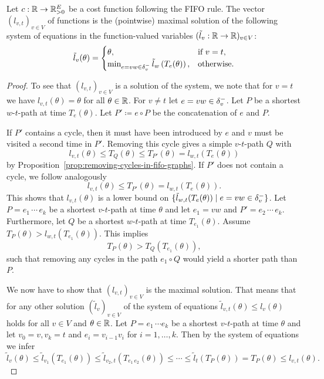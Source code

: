 \begin{proposition}\label{prop:characterization-arrival-functions}
    Let $c:\mathbb{R}\rightarrow\mathbb{R}_{>0}^E$ be a cost function following the FIFO rule.
    The vector $(l_{v,t})_{v\in V}$ of functions is the (pointwise) maximal solution of the following system of equations in the function-valued variables $(\tilde l_v: \mathbb{R} \rightarrow \mathbb{R})_{v\in V}$:
    \[
        \tilde l_v(\theta) = \begin{cases}
            \theta, &\text{if $v = t$}, \\
            \min_{\substack{
                e=vw\in\delta^-_{v}               
            }} \tilde{l}_w\left(
                T_e(\theta)
            \right), &\text{otherwise}.
        \end{cases}
    \]
\end{proposition}
\begin{proof}
    To see that $(l_{v,t})_{v\in V}$ is a solution of the system, we note that for $v = t$ we have $l_{v,t}(\theta) = \theta$ for all $\theta\in\mathbb{R}$.
    For $v\neq t$ let $e=vw\in\delta^-_{v}$.
    Let $P$ be a shortest $w$-$t$-path at time $T_{e}(\theta)$.
    Let $P'\coloneqq e\circ P$ be the concatenation of $e$ and $P$.

    If $P'$ contains a cycle, then it must have been introduced by $e$ and $v$ must be visited a second time in $P'$.
    Removing this cycle gives a simple $v$-$t$-path $Q$ with 
    \[
        l_{v,t}(\theta) \leq T_{Q}(\theta)\leq T_{P'}(\theta) = l_{w,t}(T_{e}(\theta))
    \]
    by Proposition~\ref{prop:removing-cycles-in-fifo-graphs}.
    If $P'$ does not contain a cycle, we follow analogously
    \[
        l_{v,t}(\theta) \leq T_{P'}(\theta) = l_{w,t}(T_{e}(\theta)).
    \]
    This shows that $l_{v,t}(\theta)$ is a lower bound on $\{ \tilde l_{w,t}(
        T_{e}(\theta)
    ) \mid e=vw\in\delta^-_{v}  \}$.
    Let $P = e_1\, \cdots\, e_k$ be a shortest $v$-$t$-path at time $\theta$ and let $e_1=vw$ and $P' = e_2\,\cdots\,e_k$.
    Furthermore, let $Q$ be a shortest $w$-$t$-path at time $T_{e_1}(\theta)$.
    Assume $T_{P}(\theta) > l_{w,t}(T_{e_1}(\theta))$.
    This implies
    \[
        T_{P}(\theta) > 
        T_{Q}(T_{e_1}(\theta)),
    \]
    such that removing any cycles in the path $e_1\circ Q$ would yield a shorter path than $P$.

    We now have to show that $(l_{v,t})_{v\in V}$ is the maximal solution.
    That means that for any other solution $(\tilde l_v)_{v\in V}$ of the system of equations
     $\tilde l_{v,t}(\theta) \leq l_v(\theta)$ holds for all $v\in V$ and $\theta\in\mathbb{R}$.
    Let $P = e_1 \,\cdots e_k$ be a shortest $v$-$t$-path at time $\theta$ and let $v_0 = v, v_k= t$ and $e_i = v_{i-1} v_i$ for $i=1,\dots,k$.
    Then by the system of equations we infer \[
        \tilde l_{v}(\theta) \leq \tilde l_{v_1}(T_{e_1}(\theta)) \leq \tilde l_{v_2,t}(T_{e_1\,e_2} (\theta)) \leq \cdots \leq \tilde l_{t}(T_P(\theta)) = T_P(\theta) \leq l_{v,t}(\theta).
    \]
\end{proof}

